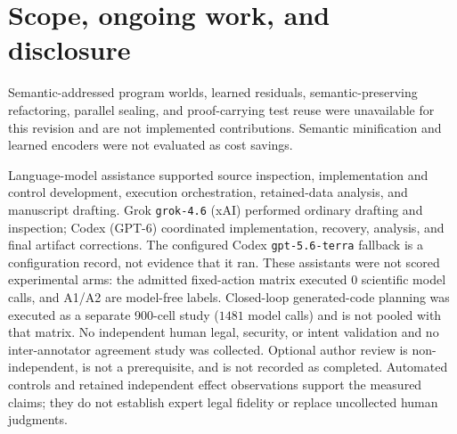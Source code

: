 \documentclass{article}
\begin{document}
\section{Scope, ongoing work, and disclosure}

Semantic-addressed program worlds, learned residuals, semantic-preserving refactoring, parallel sealing, and proof-carrying test reuse were unavailable for this revision and are not implemented contributions. Semantic minification and learned encoders were not evaluated as cost savings.

Language-model assistance supported source inspection, implementation and control development, execution orchestration, retained-data analysis, and manuscript drafting. Grok \texttt{grok-4.6} (xAI) performed ordinary drafting and inspection; Codex (GPT-6) coordinated implementation, recovery, analysis, and final artifact corrections. The configured Codex \texttt{gpt-5.6-terra} fallback is a configuration record, not evidence that it ran. These assistants were not scored experimental arms: the admitted fixed-action matrix executed $0$ scientific model calls, and A1/A2 are model-free labels. Closed-loop generated-code planning was executed as a separate 900-cell study ($1481$ model calls) and is not pooled with that matrix. No independent human legal, security, or intent validation and no inter-annotator agreement study was collected. Optional author review is non-independent, is not a prerequisite, and is not recorded as completed. Automated controls and retained independent effect observations support the measured claims; they do not establish expert legal fidelity or replace uncollected human judgments.

\clearpage

\end{document}
